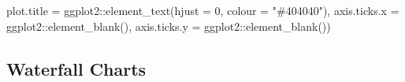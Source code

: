 \documentclass[
]{book}
\newenvironment{Shaded}{\begin{snugshade}}{\end{snugshade}}
\newcommand{\AttributeTok}[1]{\textcolor[rgb]{0.77,0.63,0.00}{#1}}
\newcommand{\DecValTok}[1]{\textcolor[rgb]{0.00,0.00,0.81}{#1}}
\newcommand{\FunctionTok}[1]{\textcolor[rgb]{0.00,0.00,0.00}{#1}}
\newcommand{\NormalTok}[1]{#1}
\newcommand{\SpecialCharTok}[1]{\textcolor[rgb]{0.00,0.00,0.00}{#1}}
\newcommand{\StringTok}[1]{\textcolor[rgb]{0.31,0.60,0.02}{#1}}
\begin{document}
\begin{Shaded}
\begin{Highlighting}[]
               \AttributeTok{plot.title =}\NormalTok{ ggplot2}\SpecialCharTok{::}\FunctionTok{element\_text}\NormalTok{(}\AttributeTok{hjust =} \DecValTok{0}\NormalTok{, }\AttributeTok{colour =} \StringTok{"\#404040"}\NormalTok{),}
               \AttributeTok{axis.ticks.x =}\NormalTok{ ggplot2}\SpecialCharTok{::}\FunctionTok{element\_blank}\NormalTok{(),}
               \AttributeTok{axis.ticks.y =}\NormalTok{ ggplot2}\SpecialCharTok{::}\FunctionTok{element\_blank}\NormalTok{())}
\end{Highlighting}
\end{Shaded}

\hypertarget{waterfall-charts-1}{%
\subsection{Waterfall Charts}\label{waterfall-charts-1}}
\end{document}
